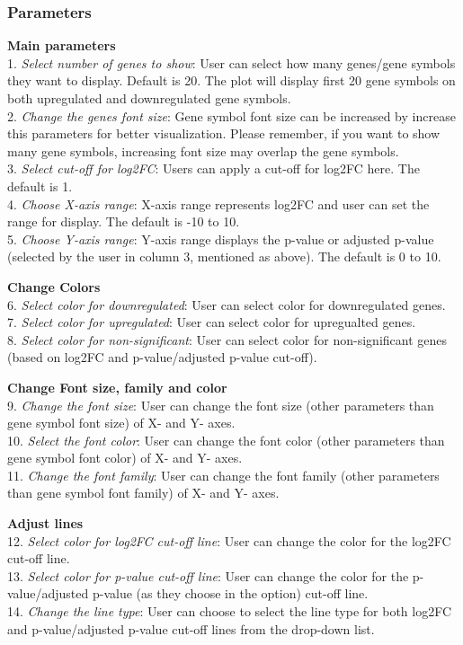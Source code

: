 \documentclass[
  a4paper,
  oneside,
  open=any]{scrreport}
\begin{document}
\hypertarget{parameters}{%
\subsubsection{Parameters}\label{parameters}}

\textbf{Main parameters}\\
1. \emph{Select number of genes to show}: User can select how many
genes/gene symbols they want to display. Default is 20. The plot will
display first 20 gene symbols on both upregulated and downregulated gene
symbols.\\
2. \emph{Change the genes font size}: Gene symbol font size can be
increased by increase this parameters for better visualization. Please
remember, if you want to show many gene symbols, increasing font size
may overlap the gene symbols.\\
3. \emph{Select cut-off for log2FC}: Users can apply a cut-off for
log2FC here. The default is 1.\\
4. \emph{Choose X-axis range}: X-axis range represents log2FC and user
can set the range for display. The default is -10 to 10.\\
5. \emph{Choose Y-axis range}: Y-axis range displays the p-value or
adjusted p-value (selected by the user in column 3, mentioned as above).
The default is 0 to 10.

\textbf{Change Colors}\\
6. \emph{Select color for downregulated}: User can select color for
downregulated genes.\\
7. \emph{Select color for upregulated}: User can select color for
upregualted genes.\\
8. \emph{Select color for non-significant}: User can select color for
non-significant genes (based on log2FC and p-value/adjusted p-value
cut-off).

\textbf{Change Font size, family and color}\\
9. \emph{Change the font size}: User can change the font size (other
parameters than gene symbol font size) of X- and Y- axes.\\
10. \emph{Select the font color}: User can change the font color (other
parameters than gene symbol font color) of X- and Y- axes.\\
11. \emph{Change the font family}: User can change the font family
(other parameters than gene symbol font family) of X- and Y- axes.

\textbf{Adjust lines}\\
12. \emph{Select color for log2FC cut-off line}: User can change the
color for the log2FC cut-off line.\\
13. \emph{Select color for p-value cut-off line}: User can change the
color for the p-value/adjusted p-value (as they choose in the option)
cut-off line.\\
14. \emph{Change the line type}: User can choose to select the line type
for both log2FC and p-value/adjusted p-value cut-off lines from the
drop-down list.
\end{document}
